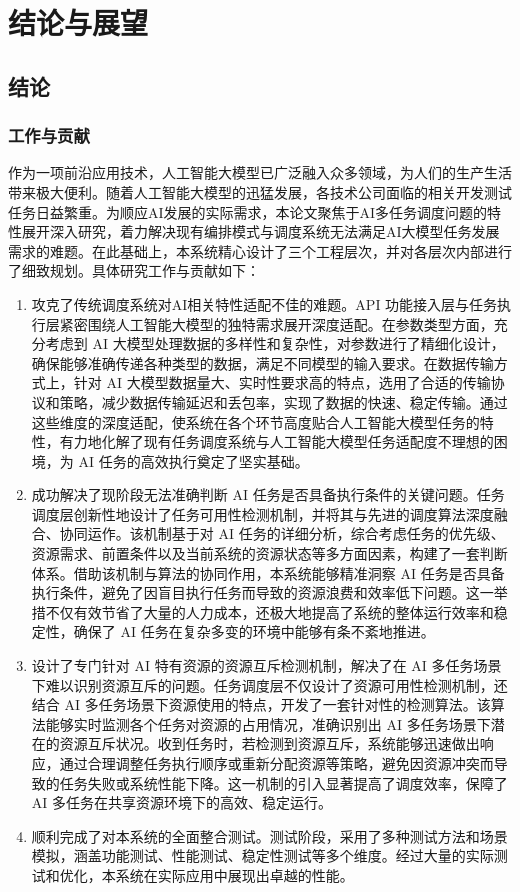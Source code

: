 \chapter{结论与展望}

\section{结论}

\subsection{工作与贡献}

作为一项前沿应用技术，人工智能大模型已广泛融入众多领域，为人们的生产生活带来极大便利。随着人工智能大模型的迅猛发展，各技术公司面临的相关开发测试任务日益繁重。为顺应AI发展的实际需求，本论文聚焦于AI多任务调度问题的特性展开深入研究，着力解决现有编排模式与调度系统无法满足AI大模型任务发展需求的难题。在此基础上，本系统精心设计了三个工程层次，并对各层次内部进行了细致规划。具体研究工作与贡献如下：

\begin{enumerate}
\item 攻克了传统调度系统对AI相关特性适配不佳的难题。API 功能接入层与任务执行层紧密围绕人工智能大模型的独特需求展开深度适配。在参数类型方面，充分考虑到 AI 大模型处理数据的多样性和复杂性，对参数进行了精细化设计，确保能够准确传递各种类型的数据，满足不同模型的输入要求。在数据传输方式上，针对 AI 大模型数据量大、实时性要求高的特点，选用了合适的传输协议和策略，减少数据传输延迟和丢包率，实现了数据的快速、稳定传输。通过这些维度的深度适配，使系统在各个环节高度贴合人工智能大模型任务的特性，有力地化解了现有任务调度系统与人工智能大模型任务适配度不理想的困境，为 AI 任务的高效执行奠定了坚实基础。
\item 成功解决了现阶段无法准确判断 AI 任务是否具备执行条件的关键问题。任务调度层创新性地设计了任务可用性检测机制，并将其与先进的调度算法深度融合、协同运作。该机制基于对 AI 任务的详细分析，综合考虑任务的优先级、资源需求、前置条件以及当前系统的资源状态等多方面因素，构建了一套判断体系。借助该机制与算法的协同作用，本系统能够精准洞察 AI 任务是否具备执行条件，避免了因盲目执行任务而导致的资源浪费和效率低下问题。这一举措不仅有效节省了大量的人力成本，还极大地提高了系统的整体运行效率和稳定性，确保了 AI 任务在复杂多变的环境中能够有条不紊地推进。
\item 设计了专门针对 AI 特有资源的资源互斥检测机制，解决了在 AI 多任务场景下难以识别资源互斥的问题。任务调度层不仅设计了资源可用性检测机制，还结合 AI 多任务场景下资源使用的特点，开发了一套针对性的检测算法。该算法能够实时监测各个任务对资源的占用情况，准确识别出 AI 多任务场景下潜在的资源互斥状况。收到任务时，若检测到资源互斥，系统能够迅速做出响应，通过合理调整任务执行顺序或重新分配资源等策略，避免因资源冲突而导致的任务失败或系统性能下降。这一机制的引入显著提高了调度效率，保障了 AI 多任务在共享资源环境下的高效、稳定运行。
\item 顺利完成了对本系统的全面整合测试。测试阶段，采用了多种测试方法和场景模拟，涵盖功能测试、性能测试、稳定性测试等多个维度。经过大量的实际测试和优化，本系统在实际应用中展现出卓越的性能。
\end{enumerate}

